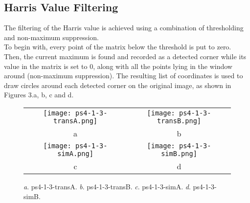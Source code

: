 \documentclass[a4paper,11pt]{article}
\begin{document}
\lstset{style=mystyle}



\subsection{Harris Value Filtering}

The filtering of the Harris value is achieved using a combination of thresholding and non-maximum suppression.\\
To begin with, every point of the matrix below the threshold is put to zero. Then, the current maximum is found and recorded as a detected corner while its value in the matrix is set to 0, along with all the points lying in the window around (non-maximum suppression).
The resulting list of coordinates is used to draw circles around each detected corner on the original image, as shown in Figures 3.a, b, c and d.\\

 \begin{figure}[H]
\begin{center}
\begin{tabular}{cc}
	\texttt{[image: ps4-1-3-transA.png]}&
	\texttt{[image: ps4-1-3-transB.png]}\\
	a&b\\
	\texttt{[image: ps4-1-3-simA.png]}&
	\texttt{[image: ps4-1-3-simB.png]}\\
	c&d
\end{tabular}
\end{center}
\caption{ 
\textit{a}. ps4-1-3-transA.  \textit{b}. ps4-1-3-transB. \textit{c}. ps4-1-3-simA.  \textit{d}. ps4-1-3-simB.  }
\label{ps-4-1-3}
\end{figure}
\end{document}
